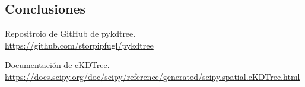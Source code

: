 \documentclass[11pt,a4paper]{article}
\begin{document}
\subsection{Conclusiones}

\newpage

\begin{thebibliography}{5}

Repositroio de GitHub de pykdtree.
\\\url{https://github.com/storpipfugl/pykdtree}

Documentación de cKDTree.
\\\url{https://docs.scipy.org/doc/scipy/reference/generated/scipy.spatial.cKDTree.html}

\end{thebibliography}
\end{document}
